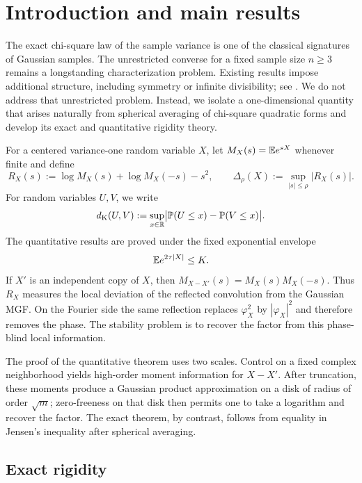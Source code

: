 \section{Introduction and main results}\label{sec:intro}

The exact chi-square law of the sample variance is one of the classical signatures of Gaussian samples. The unrestricted converse for a fixed sample size $n\ge3$ remains a longstanding characterization problem. Existing results impose additional structure, including symmetry or infinite divisibility; see \cite{Ruben1974,Ruben1978,Bondesson1977,ChristophProhorovUlyanov2001,Kruglov2013,GolikovaKruglov2015}. We do not address that unrestricted problem. Instead, we isolate a one-dimensional quantity that arises naturally from spherical averaging of chi-square quadratic forms and develop its exact and quantitative rigidity theory.

For a centered variance-one random variable $X$, let $M_X(s)=\mathbb E e^{sX}$ whenever finite and define
\begin{equation}\label{eq:defect-intro}
R_X(s):=\log M_X(s)+\log M_X(-s)-s^2,
\qquad
\Delta_\rho(X):=\sup_{|s|\le\rho}|R_X(s)|.
\end{equation}
For random variables $U,V$, we write
\[
d_{\mathrm K}(U,V):=\sup_{x\in\mathbb R}\bigl|\mathbb P(U\le x)-\mathbb P(V\le x)\bigr|.
\]
The quantitative results are proved under the fixed exponential envelope
\begin{equation}\label{eq:EI-intro}
\mathbb E e^{2\tau|X|}\le K.
\end{equation}
If $X'$ is an independent copy of $X$, then $M_{X-X'}(s)=M_X(s)M_X(-s)$. Thus $R_X$ measures the local deviation of the reflected convolution from the Gaussian MGF. On the Fourier side the same reflection replaces $\varphi_X^2$ by $|\varphi_X|^2$ and therefore removes the phase. The stability problem is to recover the factor from this phase-blind local information.

The proof of the quantitative theorem uses two scales. Control on a fixed complex neighborhood yields high-order moment information for $X-X'$. After truncation, these moments produce a Gaussian product approximation on a disk of radius of order $\sqrt m$; zero-freeness on that disk then permits one to take a logarithm and recover the factor. The exact theorem, by contrast, follows from equality in Jensen's inequality after spherical averaging.

\subsection*{Exact rigidity}

